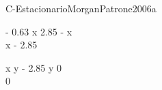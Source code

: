 
\begin{bilevelmodel}{C-Estacionario}{MorganPatrone2006a}
    \begin{upperlevel}{- 0.63 x}{
         2.85 - x  \\ 
 x - 2.85 
    }
    \end{upperlevel}
    \begin{lowerlevel}{x y - 2.85 y}{
         0  \\ 
 0 
    }
    \end{lowerlevel}
\end{bilevelmodel}
    
        